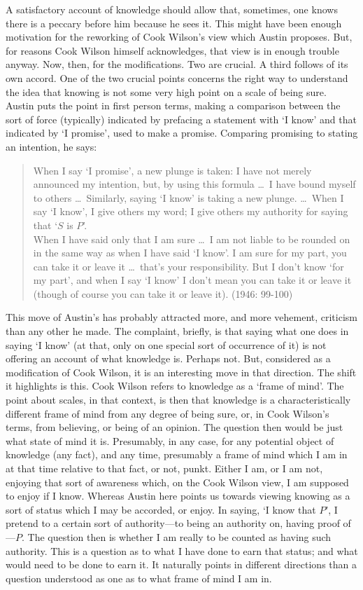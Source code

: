 A satisfactory account of knowledge should allow that, sometimes, one knows there is a peccary before him because he sees it. This might have been enough motivation for the reworking of Cook Wilson’s view which Austin proposes. But, for reasons Cook Wilson himself acknowledges, that view is in enough trouble anyway. Now, then, for the modifications. Two are crucial. A third follows of its own accord. One of the two crucial points concerns the right way to understand the idea that knowing is not some very high point on a scale of being sure. Austin puts the point in first person terms, making a comparison between the sort of force (typically) indicated by prefacing a statement with ‘I know’ and that indicated by ‘I promise’, used to make a promise. Comparing promising to stating an intention, he says:
\begin{quotation}
	\noindent When I say `I promise', a new plunge is taken: I have not merely announced my intention, but, by using this formula \ldots\ I have bound myself to others \ldots\ Similarly, saying `I know' is taking a new plunge. \ldots\ When I say `I know', I give others my word; I give others my authority for saying that `\( S \) is \( P \)'.
	\\
	When I have said only that I am sure \ldots\ I am not liable to be rounded on in the same way as when I have said `I know'. I am sure for my part, you can take it or leave it \ldots\ that’s your responsibility. But I don’t know `for my part', and when I say `I know' I don’t mean you can take it or leave it (though of course you can take it or leave it). (1946: 99-100)
\end{quotation}
This move of Austin’s has probably attracted more, and more vehement, criticism than any other he made. The complaint, briefly, is that saying what one does in saying `I know' (at that, only on one special sort of occurrence of it) is not offering an account of what knowledge is. Perhaps not. But, considered as a modification of Cook Wilson, it is an interesting move in that direction. The shift it highlights is this. Cook Wilson refers to knowledge as a `frame of mind'. The point about scales, in that context, is then that knowledge is a characteristically different frame of mind from any degree of being sure, or, in Cook Wilson’s terms, from believing, or being of an opinion. The question then would be just what state of mind it is. Presumably, in any case, for any potential object of knowledge (any fact), and any time, presumably a frame of mind which I am in at that time relative to that fact, or not, punkt. Either I am, or I am not, enjoying that sort of awareness which, on the Cook Wilson view, I am supposed to enjoy if I know. Whereas Austin here points us towards viewing knowing as a sort of status which I may be accorded, or enjoy. In saying, `I know that \( P \)', I pretend to a certain sort of authority—to being an authority on, having proof of---\( P \). The question then is whether I am really to be counted as having such authority. This is a question as to what I have done to earn that status; and what would need to be done to earn it. It naturally points in different directions than a question understood as one as to what frame of mind I am in.

